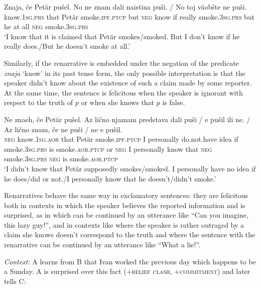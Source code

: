 \documentclass[output=paper]{langscibook}
\begin{document}
\ea\label{ex:znam}
\gll Znaja, če Petăr pušel. No ne znam dali naistina puši. {/} No toj văobšte ne puši.\\
know.\textsc{1sg.prs} that Petăr smoke.\textsc{ipf.ptcp} but \textsc{neg} know if really smoke.\textsc{3sg.prs} {} but he {at all} \textsc{neg} smoke.\textsc{3sg.prs}\\
\glt `I know that it is claimed that Petăr smokes/smoked. But I don't know if he really does.\slash But he doesn't smoke at all.'
\z

\noindent Similarly, if the renarrative is embedded under the negation of the predicate \textit{znaja} `know' in its past tense form, the only possible interpretation is that the speaker didn't know about the existence of such a claim made by some reporter. At the same time, the sentence is felicitous when the speaker is ignorant with respect to the truth of $p$ or when she knows that $p$ is false.

\ea
\gll Ne znaeh, če Petăr pušel. Az lično njamam predstava dali puši / e pušil ili ne. / Az lično znam, če ne puši / ne e pušil.\\
\textsc{neg} know.\textsc{1sg.aor} that Petăr smoke.\textsc{ipf.ptcp} I personally do.not.have idea if smoke.\textsc{3sg.prs} {} is smoke.\textsc{aor.ptcp} or \textsc{neg} {} I personally know that \textsc{neg} smoke.\textsc{3sg.prs} {} \textsc{neg} is smoke.\textsc{aor.ptcp}\\
\glt `I didn't know that Petăr supposedly smokes/smoked. I personally have no idea if he does/did or not.\slash I personally know that he doesn't/didn't smoke.'
\z

\noindent Renarratives behave the same way in exclamatory sentences: they are felicitous both in contexts in which the speaker believes the reported information and is surprised, as in  which can be continued by an utterance like ``Can you imagine, this lazy guy!'', and in contexts like  where the speaker is rather outraged by a claim she knows doesn't correspond to the truth and where the sentence with the renarrative can be continued by an utterance like ``What a lie!''.\largerpage[-2]

\eanoraggedright\label{ex:lazy-guy}\sloppy
 \textit{Context:} A learns from B that Ivan worked the previous day which happens to be a Sunday. A is surprised over this fact ($+$\textsc{belief clash}, \hspace{0pt}$+$\textsc{commitment}) and later tells C:
\end{document}
